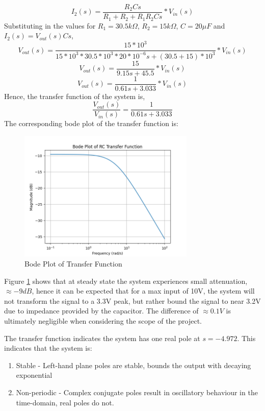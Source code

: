 \documentclass[12pt, a4paper]{article}
\begin{document}
\[I_2(s)=\frac{R_2Cs}{R_1+R_2+R_1R_2Cs}*V_{in}(s)\]
\indent Substituting in the values for $R_1=30.5k\Omega$, $R_2=15k\Omega$, $C=20{\mu}F$ and $I_2(s)=V_{out}(s)Cs$,
\[V_{out}(s)=\frac{15*10^3}{15*10^3*30.5*10^3*20*10^{-6}s+(30.5+15)*10^3}*V_{in}(s)\]
\[V_{out}(s)=\frac{15}{9.15s+45.5}*V_{in}(s)\]
\[V_{out}(s)=\frac{1}{0.61s+3.033}*V_{in}(s)\]
\indent Hence, the transfer function of the system is,
\[\frac{V_{out}(s)}{V_{in}(s)}=\frac{1}{0.61s+3.033}\]
The corresponding bode plot of the transfer function is:
\begin{figure}[H]
    \centering
    \includegraphics[width=0.75\textwidth]{bodeplot}
    \caption{Bode Plot of Transfer Function}
    \label{fig:bode_plot}
\end{figure}
\noindent Figure \ref{fig:bode_plot} shows that at steady state the system experiences small attenuation, $\approx-9dB$,
hence it can be expected that for a max input of 10V, the system will not transform the signal to a 3.3V peak, but rather
bound the signal to near 3.2V due to impedance provided by the capacitor.
The difference of $\approx 0.1V$ is ultimately negligible when considering the scope of the project.

The transfer function indicates the system has one real pole at $s=-4.972$. This indicates that the system is:
\begin{enumerate}
    \item Stable - Left-hand plane poles are stable, bounds the output with decaying exponential
    \item Non-periodic - Complex conjugate poles result in oscillatory behaviour in the time-domain, real poles do not.
\end{enumerate}
\end{document}
